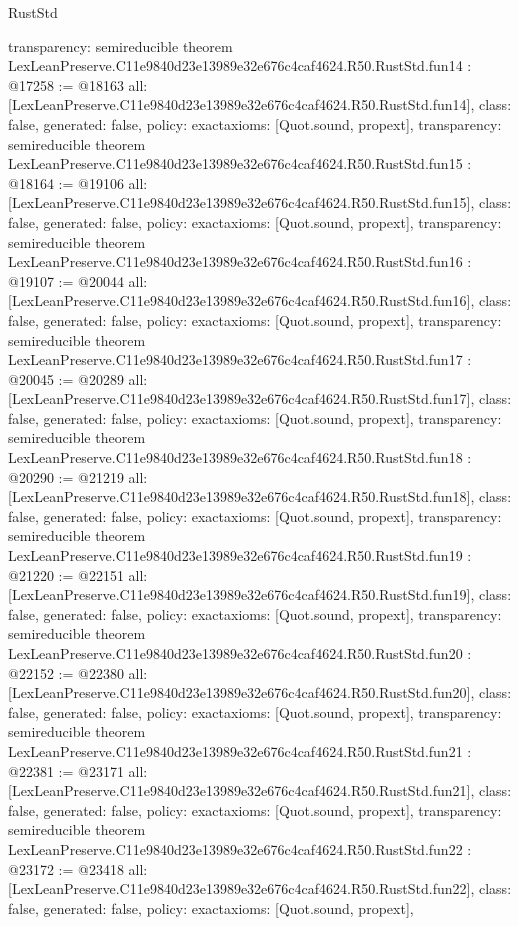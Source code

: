 \begin{lexlean}{RustStd}
\begin{coremodule}
{  transparency: semireducible
}
theorem LexLeanPreserve.C11e9840d23e13989e32e676c4caf4624.R50.RustStd.fun14 : @17258 := @18163 {
  all: [LexLeanPreserve.C11e9840d23e13989e32e676c4caf4624.R50.RustStd.fun14],
  class: false,
  generated: false,
  policy: exact{axioms: [Quot.sound, propext]},
  transparency: semireducible
}
theorem LexLeanPreserve.C11e9840d23e13989e32e676c4caf4624.R50.RustStd.fun15 : @18164 := @19106 {
  all: [LexLeanPreserve.C11e9840d23e13989e32e676c4caf4624.R50.RustStd.fun15],
  class: false,
  generated: false,
  policy: exact{axioms: [Quot.sound, propext]},
  transparency: semireducible
}
theorem LexLeanPreserve.C11e9840d23e13989e32e676c4caf4624.R50.RustStd.fun16 : @19107 := @20044 {
  all: [LexLeanPreserve.C11e9840d23e13989e32e676c4caf4624.R50.RustStd.fun16],
  class: false,
  generated: false,
  policy: exact{axioms: [Quot.sound, propext]},
  transparency: semireducible
}
theorem LexLeanPreserve.C11e9840d23e13989e32e676c4caf4624.R50.RustStd.fun17 : @20045 := @20289 {
  all: [LexLeanPreserve.C11e9840d23e13989e32e676c4caf4624.R50.RustStd.fun17],
  class: false,
  generated: false,
  policy: exact{axioms: [Quot.sound, propext]},
  transparency: semireducible
}
theorem LexLeanPreserve.C11e9840d23e13989e32e676c4caf4624.R50.RustStd.fun18 : @20290 := @21219 {
  all: [LexLeanPreserve.C11e9840d23e13989e32e676c4caf4624.R50.RustStd.fun18],
  class: false,
  generated: false,
  policy: exact{axioms: [Quot.sound, propext]},
  transparency: semireducible
}
theorem LexLeanPreserve.C11e9840d23e13989e32e676c4caf4624.R50.RustStd.fun19 : @21220 := @22151 {
  all: [LexLeanPreserve.C11e9840d23e13989e32e676c4caf4624.R50.RustStd.fun19],
  class: false,
  generated: false,
  policy: exact{axioms: [Quot.sound, propext]},
  transparency: semireducible
}
theorem LexLeanPreserve.C11e9840d23e13989e32e676c4caf4624.R50.RustStd.fun20 : @22152 := @22380 {
  all: [LexLeanPreserve.C11e9840d23e13989e32e676c4caf4624.R50.RustStd.fun20],
  class: false,
  generated: false,
  policy: exact{axioms: [Quot.sound, propext]},
  transparency: semireducible
}
theorem LexLeanPreserve.C11e9840d23e13989e32e676c4caf4624.R50.RustStd.fun21 : @22381 := @23171 {
  all: [LexLeanPreserve.C11e9840d23e13989e32e676c4caf4624.R50.RustStd.fun21],
  class: false,
  generated: false,
  policy: exact{axioms: [Quot.sound, propext]},
  transparency: semireducible
}
theorem LexLeanPreserve.C11e9840d23e13989e32e676c4caf4624.R50.RustStd.fun22 : @23172 := @23418 {
  all: [LexLeanPreserve.C11e9840d23e13989e32e676c4caf4624.R50.RustStd.fun22],
  class: false,
  generated: false,
  policy: exact{axioms: [Quot.sound, propext]},
}
\end{coremodule}
\end{lexlean}
